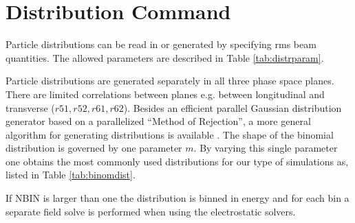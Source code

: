 \chapter{Distribution Command}
\label{chp:distribution}
Particle distributions can be read in or generated by specifying rms beam quantities.
The allowed parameters are described in Table \ref{tab:distrparam}.

Particle distributions are generated separately in all three phase space planes.
There are limited correlations between planes e.g. between longitudinal and transverse ($r51,r52,r61,r62$).
Besides an efficient parallel Gaussian distribution generator based on a parallelized 
``Method of Rejection'',
a more general algorithm for generating
distributions is available \cite{JohoDist}. The shape of the binomial distribution is governed by
one parameter $m$. By varying this single parameter one obtains the most commonly 
used distributions for our
type of simulations as, listed in Table \ref{tab:binomdist}.

If NBIN is larger than one the distribution is binned in energy and for each bin a separate field solve is
performed when using the electrostatic solvers.
 
